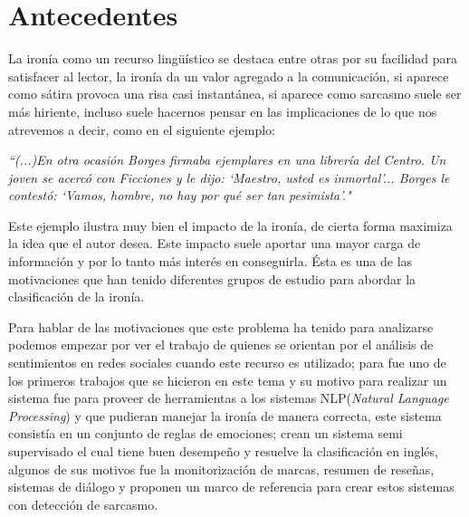 \chapter{Antecedentes}\label{cap.antecedentes}
	
	    \par La ironía como un recurso lingüístico se destaca entre otras por su facilidad para satisfacer al lector, la ironía da un valor agregado a la comunicación, si aparece como sátira provoca una risa casi instantánea, si aparece como sarcasmo suele ser más hiriente, incluso suele hacernos pensar en las implicaciones de lo que nos atrevemos a decir, como en el siguiente ejemplo:
	    
	        \begin{center}
	        \textit{``(...)En otra ocasión Borges firmaba ejemplares en una librería del Centro. Un joven se acercó con Ficciones y le dijo: `Maestro, usted es inmortal'... Borges le contestó: `Vamos, hombre, no hay por qué ser tan pesimista'."} \cite{Sergio2012}
	        \vspace{5pt}
	        \end{center}
	            \vspace{5pt}
	   
	   \par Este ejemplo ilustra muy bien el impacto de la ironía, de cierta forma maximiza la idea que el autor desea. Este impacto suele aportar una mayor carga de información y por lo tanto más interés en conseguirla. Ésta es una de las motivaciones que han tenido diferentes grupos de estudio para abordar la clasificación de la ironía. 
	   
	   \par Para hablar de las motivaciones que este problema ha tenido para analizarse podemos empezar por ver el trabajo de \cite{maynard2014cares} quienes se orientan por el análisis de sentimientos en redes sociales cuando este recurso es utilizado; para \cite{utsumi1995interpret} fue uno de los primeros trabajos que se hicieron en este tema y su motivo para realizar un sistema fue para proveer de herramientas a los sistemas NLP(\textit{Natural Language Processing}) y que pudieran manejar la ironía de manera correcta, este sistema consistía en un conjunto de reglas de emociones; \cite{davidov2010semi} crean un sistema semi supervisado el cual tiene buen desempeño y resuelve la clasificación en inglés, algunos de sus motivos fue la monitorización de marcas, resumen de reseñas, sistemas de diálogo y proponen un marco de referencia para crear estos sistemas con detección de sarcasmo. 
